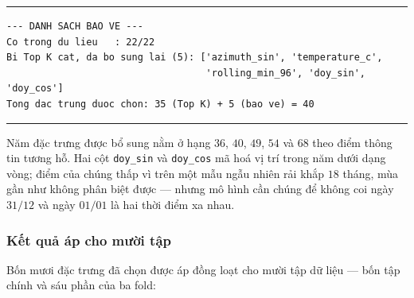 \documentclass[12pt, a4paper]{report}
\begin{document}
\begingroup
\par\vspace{6pt}\hrule\vspace{4pt}
\footnotesize\renewcommand{\baselinestretch}{1.0}\selectfont
\begin{verbatim}
--- DANH SACH BAO VE ---
Co trong du lieu   : 22/22
Bi Top K cat, da bo sung lai (5): ['azimuth_sin', 'temperature_c',
                                   'rolling_min_96', 'doy_sin', 'doy_cos']
Tong dac trung duoc chon: 35 (Top K) + 5 (bao ve) = 40
\end{verbatim}
\vspace{2pt}\hrule\par\vspace{6pt}
\endgroup

Năm đặc trưng được bổ sung nằm ở hạng $36$, $40$, $49$, $54$ và $68$ theo điểm thông tin tương
hỗ. Hai cột \texttt{doy\_sin} và \texttt{doy\_cos} mã hoá vị trí trong năm dưới dạng vòng; điểm của
chúng thấp vì trên một mẫu ngẫu nhiên rải khắp $18$ tháng, mùa gần như không phân biệt được ---
nhưng mô hình cần chúng để không coi ngày $31/12$ và ngày $01/01$ là hai thời điểm xa nhau.

\subsubsection{Kết quả áp cho mười tập}

Bốn mươi đặc trưng đã chọn được áp đồng loạt cho mười tập dữ liệu --- bốn tập chính và sáu phần
của ba fold:
\end{document}
